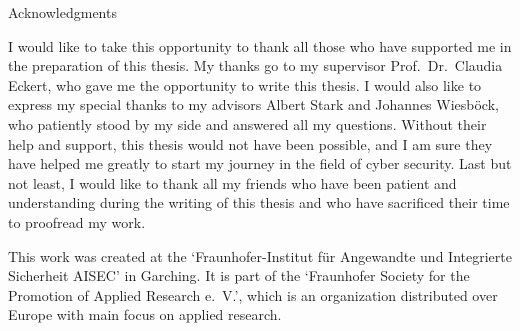 \thispagestyle{empty}

\vspace*{20mm}

\begin{center}
    { Acknowledgments}
\end{center}

\vspace{10mm}

I would like to take this opportunity to thank all those who have supported me in the preparation of this thesis.
My thanks go to my supervisor Prof.\ Dr.\ Claudia Eckert, who gave me the opportunity to write this thesis.
I would also like to express my special thanks to my advisors Albert Stark and Johannes Wiesböck, who patiently stood by my side and answered all my questions.
Without their help and support, this thesis would not have been possible, and I am sure they have helped me greatly to start my journey in the field of cyber security.
Last but not least, I would like to thank all my friends who have been patient and understanding during the writing of this thesis and who have sacrificed their time to proofread my work.

This work was created at the `Fraunhofer-Institut für Angewandte und Integrierte Sicherheit AISEC' in Garching.
It is part of the `Fraunhofer Society for the Promotion of Applied Research e.~V.', which is an organization distributed over Europe with main focus on applied research.

\cleardoublepage{}
